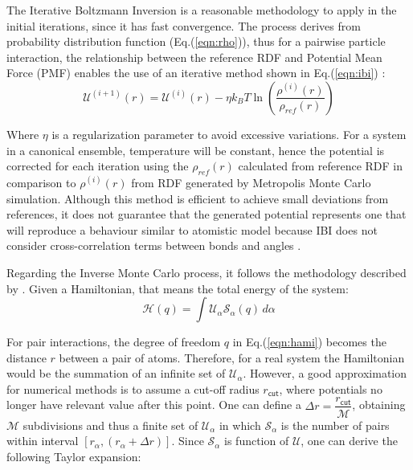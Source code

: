 \documentclass[10pt,a4paper,twoside]{article}
\begin{document}
 The Iterative Boltzmann Inversion is a reasonable methodology to apply in the initial iterations, since it has fast convergence. The process derives from probability distribution function (Eq.(\ref{eqn:rho})), thus for a pairwise particle interaction, the relationship between the reference RDF and Potential Mean Force (PMF) enables the use of an iterative method shown in Eq.(\ref{eqn:ibi}) \cite{ibi}:
   \begin{equation}
\mathcal{U}^{(i+1)}(r) = \mathcal{U}^{(i)}(r) - \eta k_B T \ln{\left(\dfrac{\rho^{(i)}(r)}{\rho_{ref}(r)}\right)}
\label{eqn:ibi}
\end{equation}

 Where $\eta$ is a regularization parameter to avoid excessive variations. For a system in a canonical ensemble, temperature will be constant, hence the potential is corrected for each iteration using the $\rho_{ref}(r)$ calculated from reference RDF in comparison to $\rho^{(i)}(r)$ from  RDF generated by Metropolis Monte Carlo simulation. Although this method is efficient to achieve small deviations from references, it does not guarantee that the generated potential represents one that will reproduce a behaviour similar to atomistic model because IBI does not consider cross-correlation terms between bonds and angles \cite{magic}.   
 
 Regarding the Inverse Monte Carlo process, it follows the methodology described by . Given a Hamiltonian, that means the total energy of the system:
 \begin{equation}
\mathcal{H}(q) = \displaystyle \int \mathcal{U}_\alpha\mathcal{S}_\alpha(q) \,d\alpha
\label{eqn:hami}
\end{equation}

For pair interactions, the degree of freedom $q$ in Eq.(\ref{eqn:hami}) becomes the distance $r$ between a pair of atoms. Therefore, for a real system the Hamiltonian would be the summation of an infinite set of $\mathcal{U}_\alpha$. However, a good approximation for numerical methods is to assume a cut-off radius $r_{\mathsf{cut}}$, where potentials no longer have relevant value after this point. One can define a $\Delta r = \dfrac{r_{\mathsf{cut}}}{\mathcal{M}}$, obtaining $\mathcal{M}$ subdivisions and thus a finite set of  $\mathcal{U}_{\alpha}$ in which $\mathcal{S}_\alpha$ is the number of pairs within  interval $[r_\alpha,(r_\alpha + \Delta r)]$. Since $\mathcal{S}_\alpha$ is function of $\mathcal{U}$, one can derive the following Taylor expansion:
\end{document}
